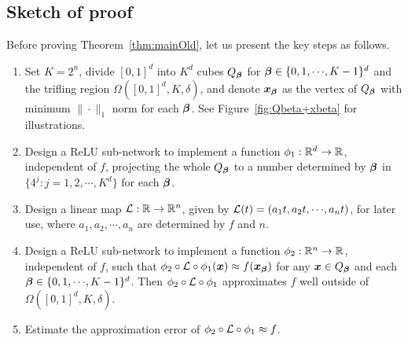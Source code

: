 \documentclass[nohyperref]{article}
\theoremstyle{plain}
\theoremstyle{definition}
\theoremstyle{remark}
\begin{document}
\subsection{Sketch of proof}
\label{sec:proof:sketch:main:old}
Before proving Theorem~\ref{thm:mainOld}, let us present the key steps as follows.
\begin{enumerate}[1.]
	\item Set $K=2^n$, divide $[0,1]^d$ into $K^d$ cubes $Q_{\bm{\beta}}$ for $\bmbeta\in\{0,1,\cdots,K-1\}^d$ and the trifling region $\Omega([0,1]^d,K,\delta)$, and denote ${\bm{x}}_{\bm{\beta}}$ as the vertex of $Q_{\bm{\beta}}$ with minimum $\|\cdot\|_1$ norm for each ${\bm{\beta}}$. See Figure~\ref{fig:Qbeta+xbeta} for illustrations.
	
	\item Design a ReLU sub-network to implement a function $\phi_1:\R^d\to \R$, independent of $f$, projecting the whole $Q_{\bm{\beta}}$ to a number determined by ${\bm{\beta}}$ in $\{4^j:j=1,2,\cdots,K^d\}$ for each ${\bm{\beta}}$. 
	
	\item Design a linear map $\calL:\R\to \R^n$, given by $\calL(t)=(a_1t, a_2 t, \cdots , a_n t)$, for later use, where $a_1, a_2, \cdots, a_n$ are determined by $f$ and $n$.
	
	\item Design a ReLU sub-network to implement a function $\phi_2:\R^n\to \R$, independent of $f$, such that $\phi_2\circ{\mathcal{L}}\circ\phi_1({\bm{x}})\approx f({\bm{x}}_{\bm{\beta}})$ for any ${\bm{x}} \in Q_{\bm{\beta}}$ and each $\bmbeta\in\{0,1,\cdots,K-1\}^d$. Then $\phi_2\circ{\mathcal{L}}\circ\phi_1$ approximates $f$ well outside of $\Omega([0,1]^d,K,\delta)$. 
	
	\item Estimate the approximation error of $\phi_2\circ{\mathcal{L}}\circ\phi_1\approx f$.
\end{enumerate}
\end{document}
